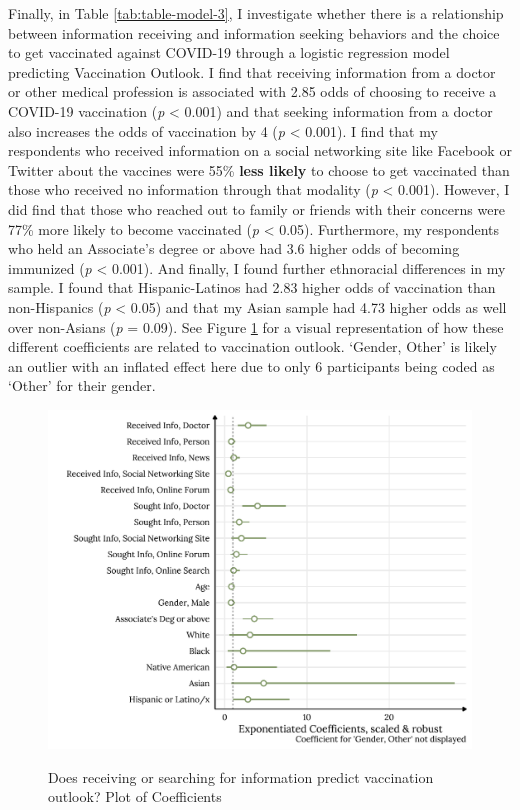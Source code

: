 Finally, in Table \ref{tab:table-model-3}, I investigate whether there is a
relationship between information receiving and information seeking behaviors and
the choice to get vaccinated against COVID-19 through a logistic regression
model predicting Vaccination Outlook. I find that receiving information from a
doctor or other medical profession is associated with 2.85 odds of choosing to
receive a COVID-19 vaccination (\emph{p} \textless{} 0.001) and that seeking
information from a doctor also increases the odds of vaccination by 4 (\emph{p}
\textless{} 0.001). I find that my respondents who received information on a
social networking site like Facebook or Twitter about the vaccines were 55\%
\textbf{less likely} to choose to get vaccinated than those who received no
information through that modality (\emph{p} \textless{} 0.001). However, I did
find that those who reached out to family or friends with their concerns were
77\% more likely to become vaccinated (\emph{p} \textless{} 0.05). Furthermore,
my respondents who held an Associate's degree or above had 3.6 higher odds of
becoming immunized (\emph{p} \textless{} 0.001). And finally, I found further
ethnoracial differences in my sample. I found that Hispanic-Latinos had 2.83
higher odds of vaccination than non-Hispanics (\emph{p} \textless{} 0.05) and
that my Asian sample had 4.73 higher odds as well over non-Asians (\emph{p}  =
0.09). See Figure \ref{fig:plot-model-3} for a visual representation of how
these different coefficients are related to vaccination outlook. `Gender, Other'
is likely an outlier with an inflated effect here due to only 6 participants
being coded as `Other' for their gender. 

\begin{figure}[h]
{\centering \includegraphics[width=0.8\linewidth]{figs/paper2/plot-model-3-1}}
\caption{Does receiving or searching for information predict vaccination outlook? Plot of Coefficients}\label{fig:plot-model-3}
\end{figure}

